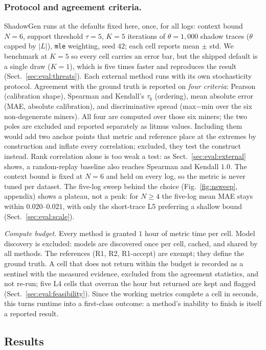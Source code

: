 \documentclass[runningheads]{llncs}
\begin{document}
\subsubsection{Protocol and agreement criteria.}
ShadowGen runs at the defaults fixed here, once, for all logs: context bound $N{=}6$, support threshold $\tau{=}5$, $K{=}5$ iterations of $\theta{=}1{,}000$ shadow traces ($\theta$ capped by $|L|$), \texttt{mle} weighting, seed $42$; each cell reports mean $\pm$ std. We benchmark at $K{=}5$ so every cell carries an error bar, but the shipped default is a single draw ($K{=}1$), which is five times faster and reproduces the result (Sect.~\ref{sec:eval:threats}). Each external method runs with its own stochasticity protocol. Agreement with the ground truth is reported on \emph{four criteria}: Pearson (calibration shape), Spearman and Kendall's $\tau_b$ (ordering), mean absolute error (MAE, absolute calibration), and discriminative spread (max$-$min over the six non-degenerate miners). All four are computed over those six miners; the two poles are excluded and reported separately as litmus values. Including them would add two anchor points that metric and reference place at the extremes by construction and inflate every correlation; excluded, they test the construct instead. Rank correlation alone is too weak a test: as Sect.~\ref{sec:eval:external} shows, a random-replay baseline also reaches Spearman and Kendall $1.0$. The context bound is fixed at $N{=}6$ and held on every log, so the metric is never tuned per dataset. The five-log sweep behind the choice (Fig.~\ref{fig:nsweep}, appendix) shows a plateau, not a peak: for $N\ge4$ the five-log mean MAE stays within $0.020$--$0.021$, with only the short-trace L5 preferring a shallow bound (Sect.~\ref{sec:eval:scale}).

\emph{Compute budget.} Every method is granted $1$ hour of metric time per cell. Model discovery is excluded: models are discovered once per cell, cached, and shared by all methods. The references (R1, R2, R1-accept) are exempt; they define the ground truth. A cell that does not return within the budget is recorded as a sentinel with the measured evidence, excluded from the agreement statistics, and not re-run; five L4 cells that overran the hour but returned are kept and flagged (Sect.~\ref{sec:eval:feasibility}). Since the working metrics complete a cell in seconds, this turns runtime into a first-class outcome: a method's inability to finish is itself a reported result.

\subsection{Results}
\label{sec:eval:results}
\end{document}
